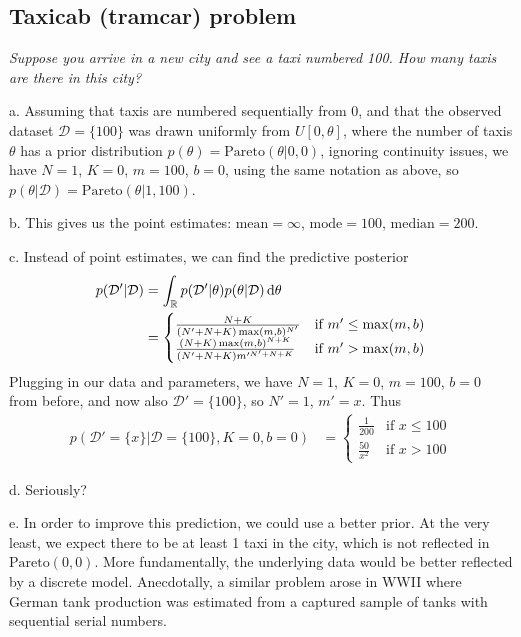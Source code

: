 \subsection{Taxicab (tramcar) problem}
\textit{Suppose you arrive in a new city and see a taxi numbered 100. How many taxis are there in this city?}

a. Assuming that taxis are numbered sequentially from 0, and that the observed dataset $\mathcal{D} = \{100\}$ was drawn uniformly from $U[0, \theta]$, where the number of taxis $\theta$ has a prior distribution $p(\theta) = \text{Pareto}(\theta|0,0)$, ignoring continuity issues, we have $N=1$, $K=0$, $m=100$, $b=0$, using the same notation as above, so $p(\theta|\mathcal{D}) = \mathrm{Pareto}(\theta|1,100)$.

b. This gives us the point estimates: $\mathrm{mean} = \infty$, $\mathrm{mode} = 100$, $\mathrm{median} = 200$.

c. Instead of point estimates, we can find the predictive posterior
\begin{align*}
p(\mathcal{D}'|\mathcal{D}) &= \int_\mathbb{R} p(\mathcal{D}'|\theta)p(\theta|\mathcal{D}) \mathop{}\!\mathrm{d} \theta\\
&= \begin{cases}
\frac{N+K}{(N'+N+K)\max(m,b)^{N'}} &\text{if $m'\leq\max(m,b)$}\\
\frac{(N+K)\max(m,b)^{N+K}}{(N'+N+K)m'^{N'+N+K}} &\text{if $m'>\max(m,b)$}
\end{cases}
\end{align*}
Plugging in our data and parameters, we have $N=1$, $K=0$, $m=100$, $b=0$ from before, and now also $\mathcal{D}'=\{100\}$, so $N'=1$, $m'=x$. Thus
\begin{align*}
p(\mathcal{D}'=\{x\}|\mathcal{D}=\{100\},K=0,b=0) &= \begin{cases}
\frac{1}{200} &\text{if $x\leq100$}\\
\frac{50}{x^2} &\text{if $x>100$}
\end{cases}
\end{align*}

d. Seriously?

e. In order to improve this prediction, we could use a better prior. At the very least, we expect there to be at least 1 taxi in the city, which is not reflected in $\text{Pareto}(0,0)$. More fundamentally, the underlying data would be better reflected by a discrete model. Anecdotally, a similar problem arose in WWII where German tank production was estimated from a captured sample of tanks with sequential serial numbers.

